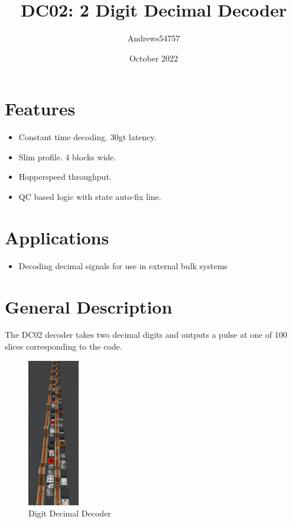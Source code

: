\documentclass[10pt]{datasheet}
\title{DC02: 2 Digit Decimal Decoder}
\author{Andrews54757}
\date{October 2022}
\begin{document}
\maketitle

\section{Features}

\begin{itemize}
\item{Constant time decoding. 30gt latency.}
\item{Slim profile. 4 blocks wide.}
\item{Hopperspeed throughput.}
\item{QC based logic with state auto-fix line.}
\end{itemize}

\section{Applications}

\begin{itemize}
\item{Decoding decimal signals for use in external bulk systems}
\end{itemize}

\section{General Description}
The DC02 decoder takes two decimal digits and outputs a pulse at one of 100 slices corresponding to the code.
\vfill\break

\begin{figure}[h]
    \centering
    \includegraphics[width=0.2\textwidth]{decoderfront.png}
    \caption{ Digit Decimal Decoder}
\end{figure}
\end{document}
